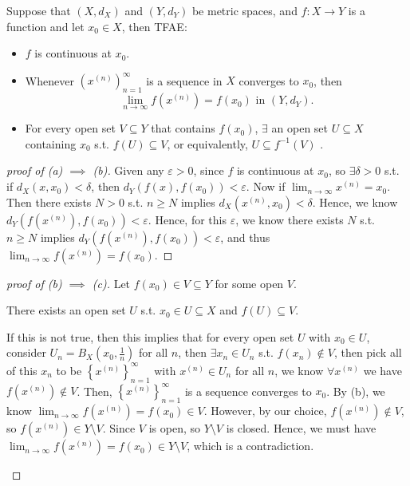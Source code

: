 \begin{theorem} \label{thm: continuous TFAE 1}
    Suppose that \((X, d_X)\) and \((Y, d_Y)\) be metric spaces, and \(f:X \to Y\) is a function and let \(x_0 \in X\), then TFAE: 
    \begin{itemize}
        \item [(a)] \(f\) is continuous at \(x_0\).  
        \item [(b)] Whenever \(\left( x^{(n)} \right)_{n=1}^{\infty}  \) is a sequence in \(X\) converges to \(x_0\), then 
        \[
            \lim_{n \to \infty} f \left( x^{(n)} \right) = f(x_0) \text{ in } \left( Y, d_Y \right).   
        \]
        \item [(c)] For every open set \(V \subseteq Y\) that contains \(f(x_0)\), \(\exists \) an open set \(U \subseteq X\) containing \(x_0\) s.t. \(f(U) \subseteq V\), or equivalently, \(U \subseteq f^{-1}(V)\) .      
    \end{itemize}  
\end{theorem}
\begin{proof}[proof of (a) \(\implies \) (b)]
    Given any \(\varepsilon > 0\), since \(f\) is continuous at \(x_0\), so \(\exists \delta > 0\) s.t. if \(d_X(x, x_0) < \delta \), then \(d_Y (f(x), f(x_0)) < \varepsilon \). Now if \(\lim_{n \to \infty} x^{(n)} = x_0 \). Then there exists \(N > 0\) s.t. \(n \ge N\) implies \(d_X \left( x^{(n)}, x_0 \right) < \delta  \). Hence, we know \(d_Y \left( f \left( x^{(n)}\right),f(x_0)   \right) < \varepsilon \). Hence, for this \(\varepsilon \), we know there exists \(N\) s.t. \(n \ge N\) implies \(d_Y \left( f \left( x^{(n)} \right), f(x_0)  \right) < \varepsilon  \), and thus \(\lim_{n \to \infty} f \left( x^{(n)} \right) = f(x_0)  \).         
\end{proof}
\begin{proof}[proof of (b) \(\implies \) (c)]
    Let \(f(x_0) \in V \subseteq Y\) for some open \(V\).
    \begin{claim}
        There exists an open set \(U\) s.t. \(x_0 \in U \subseteq X\) and \(f(U) \subseteq V\).   
    \end{claim}
    \begin{explanation}
        If this is not true, then this implies that for every open set \(U\) with \(x_0 \in U\), consider \(U_n = B_X \left( x_0, \frac{1}{n} \right) \) for all \(n\), then \(\exists x_n \in U_n\) s.t. \(f(x_n) \notin V\), then pick all of this \(x_n\) to be \(\left\{ x^{(n)} \right\}_{n=1}^{\infty}  \) with \(x^{(n)} \in U_n\) for all \(n\), we know \(\forall x^{(n)}\) we have \(f \left( x^{(n)} \right) \notin V \).    
        Then, \(\left\{ x^{(n)} \right\}_{n=1}^{\infty}  \) is a sequence converges to \(x_0\). By (b), we know \(\lim_{n \to \infty} f \left( x^{(n)} \right) = f(x_0) \in V  \). However, by our choice, \(f \left( x^{(n)} \right) \notin V \), so \(f \left( x^{(n)} \right) \in Y \setminus V \). Since \(V\) is open, so \(Y\setminus V\) is closed. Hence, we must have \(\lim_{n \to \infty} f \left( x^{(n)} \right) = f(x_0) \in Y \setminus V  \), which is a contradiction. 
    \end{explanation}
\end{proof}
